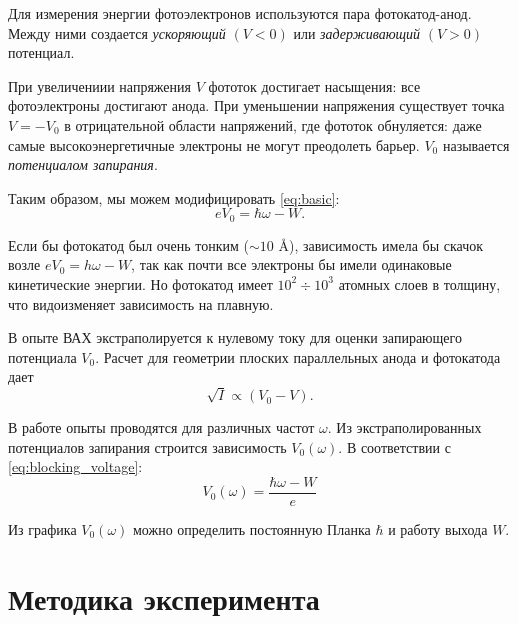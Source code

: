 \documentclass[a4paper, 12pt]{article} %
\begin{document}
	Для измерения энергии фотоэлектронов используются пара фотокатод-анод. Между ними создается \textit{ускоряющий} $(V < 0)$ или \textit{задерживающий} $(V > 0)$ потенциал.
	
	При увеличениии напряжения $V$ фототок достигает насыщения: все фотоэлектроны достигают анода. При уменьшении напряжения существует точка $V = -V_0$  в отрицательной области напряжений, где фототок обнуляется: даже самые высокоэнергетичные электроны не могут преодолеть барьер. $V_0$ называется \textit{потенциалом запирания}.
	
	Таким образом, мы можем модифицировать \eqref{eq:basic}:
	\begin{equation}
		e V_0 = \hbar \omega - W.
		\label{eq:blocking_voltage}
	\end{equation}
	
	Если бы фотокатод был очень тонким ($\sim 10$ \AA), зависимость  имела бы скачок возле $eV_0 = h\omega - W$, так как почти все электроны бы имели одинаковые кинетические энергии. Но фотокатод имеет $10^2 \div 10^3$ атомных слоев в толщину, что видоизменяет зависимость на плавную.
	
	В опыте ВАХ экстраполируется к нулевому току для оценки запирающего потенциала $V_0$. Расчет для геометрии плоских параллельных анода и фотокатода дает 
	\begin{equation}
		\sqrt{I} \propto (V_0 - V).
		\label{eq:iv}
	\end{equation}
	
	В работе опыты проводятся для различных частот $\omega$. Из экстраполированных потенциалов запирания строится зависимость $V_0(\omega)$. В соответствии с \eqref{eq:blocking_voltage}:
	\begin{equation}
		V_0(\omega) = \frac{\hbar\omega - W}{e}
		\label{eq:v0_omega}
	\end{equation}
	
	Из графика $V_0(\omega)$ можно определить постоянную Планка $\hbar$ и работу выхода $W$.
	
	\section{Методика эксперимента}
	
\end{document}
